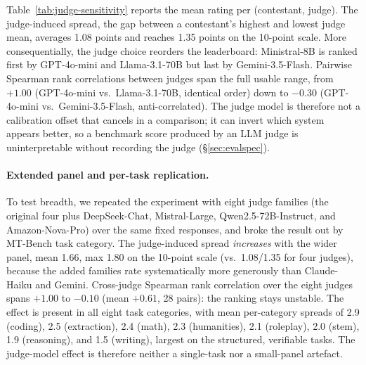 \documentclass[11pt]{article}
\begin{document}
Table~\ref{tab:judge-sensitivity} reports the mean rating per
(contestant, judge). The judge-induced spread, the gap between a contestant's
highest and lowest judge mean, averages 1.08 points and reaches 1.35 points on
the 10-point scale. More consequentially, the judge choice reorders the
leaderboard: Ministral-8B is ranked first by GPT-4o-mini and Llama-3.1-70B but
last by Gemini-3.5-Flash. Pairwise Spearman rank correlations between judges
span the full usable range, from $+1.00$ (GPT-4o-mini vs.\ Llama-3.1-70B,
identical order) down to $-0.30$ (GPT-4o-mini vs.\ Gemini-3.5-Flash,
anti-correlated). The judge model is therefore not a calibration offset that
cancels in a comparison; it can invert which system appears better, so a
benchmark score produced by an LLM judge is uninterpretable without recording
the judge (\S\ref{sec:evalspec}).

\paragraph{Extended panel and per-task replication.} To test breadth, we repeated
the experiment with eight judge families (the original four plus DeepSeek-Chat,
Mistral-Large, Qwen2.5-72B-Instruct, and Amazon-Nova-Pro) over the same fixed
responses, and broke the result out by MT-Bench task category. The judge-induced
spread \emph{increases} with the wider panel, mean 1.66, max 1.80 on the
10-point scale (vs.\ 1.08/1.35 for four judges), because the added families rate
systematically more generously than Claude-Haiku and Gemini. Cross-judge Spearman
rank correlation over the eight judges spans $+1.00$ to $-0.10$ (mean $+0.61$,
28 pairs): the ranking stays unstable. The effect is present in all eight task
categories, with mean per-category spreads of 2.9 (coding), 2.5 (extraction),
2.4 (math), 2.3 (humanities), 2.1 (roleplay), 2.0 (stem), 1.9 (reasoning), and
1.5 (writing), largest on the structured, verifiable tasks. The judge-model
effect is therefore neither a single-task nor a small-panel artefact.
\end{document}
